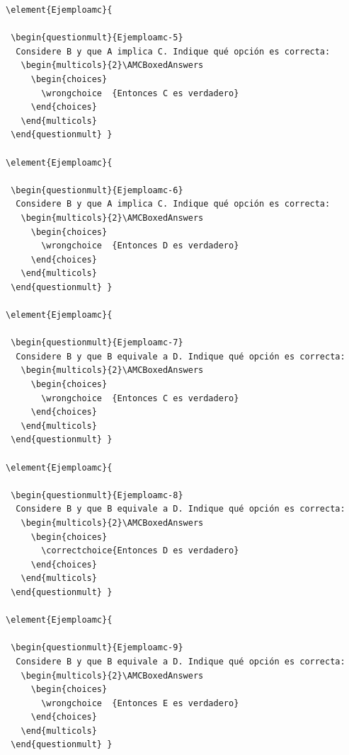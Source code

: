 \documentclass[10pt,a4paper]{report}
\begin{document}
\begin{enumerate}
{\begin{verbatim}
\element{Ejemploamc}{

 \begin{questionmult}{Ejemploamc-5}
  Considere B y que A implica C. Indique qué opción es correcta: 
   \begin{multicols}{2}\AMCBoxedAnswers
     \begin{choices}
       \wrongchoice  {Entonces C es verdadero}
     \end{choices}
   \end{multicols}
 \end{questionmult} }

\element{Ejemploamc}{

 \begin{questionmult}{Ejemploamc-6}
  Considere B y que A implica C. Indique qué opción es correcta: 
   \begin{multicols}{2}\AMCBoxedAnswers
     \begin{choices}
       \wrongchoice  {Entonces D es verdadero}
     \end{choices}
   \end{multicols}
 \end{questionmult} }

\element{Ejemploamc}{

 \begin{questionmult}{Ejemploamc-7}
  Considere B y que B equivale a D. Indique qué opción es correcta: 
   \begin{multicols}{2}\AMCBoxedAnswers
     \begin{choices}
       \wrongchoice  {Entonces C es verdadero}
     \end{choices}
   \end{multicols}
 \end{questionmult} }

\element{Ejemploamc}{

 \begin{questionmult}{Ejemploamc-8}
  Considere B y que B equivale a D. Indique qué opción es correcta: 
   \begin{multicols}{2}\AMCBoxedAnswers
     \begin{choices}
       \correctchoice{Entonces D es verdadero}
     \end{choices}
   \end{multicols}
 \end{questionmult} }

\element{Ejemploamc}{

 \begin{questionmult}{Ejemploamc-9}
  Considere B y que B equivale a D. Indique qué opción es correcta: 
   \begin{multicols}{2}\AMCBoxedAnswers
     \begin{choices}
       \wrongchoice  {Entonces E es verdadero}
     \end{choices}
   \end{multicols}
 \end{questionmult} }
\end{verbatim}
}
\end{enumerate}
\end{document}
